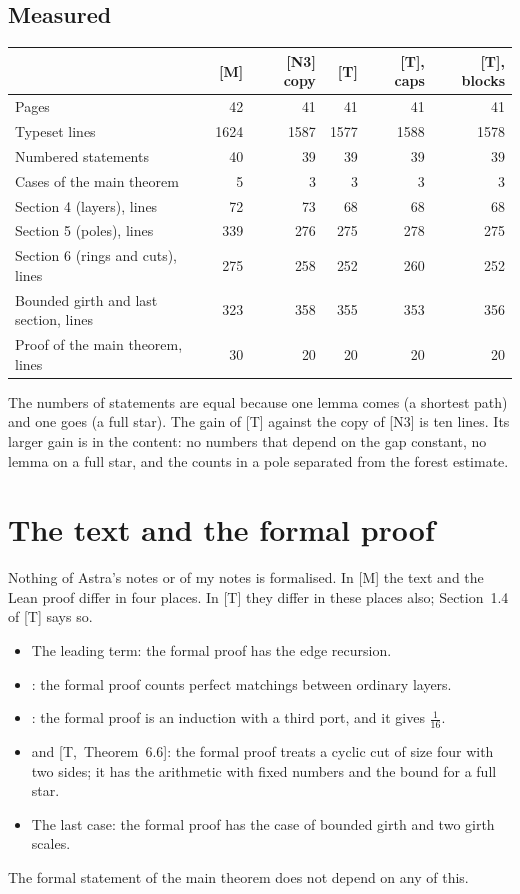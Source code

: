 \documentclass[11pt]{article}
\newcommand{\T}[1]{[T,~#1]}
\begin{document}
\subsection{Measured}

\begin{center}\small
\begin{tabular}{@{}p{5.2cm}rrrrr@{}}
\toprule
 & \textsf{\textbf{[M]}} & \textsf{\textbf{[N3] copy}} & \textsf{\textbf{[T]}} & \textsf{\textbf{[T], caps}} & \textsf{\textbf{[T], blocks}}\\
\midrule
Pages & 42 & 41 & 41 & 41 & 41\\
Typeset lines & 1624 & 1587 & 1577 & 1588 & 1578\\
Numbered statements & 40 & 39 & 39 & 39 & 39\\
Cases of the main theorem & 5 & 3 & 3 & 3 & 3\\
Section 4 (layers), lines & 72 & 73 & 68 & 68 & 68\\
Section 5 (poles), lines & 339 & 276 & 275 & 278 & 275\\
Section 6 (rings and cuts), lines & 275 & 258 & 252 & 260 & 252\\
Bounded girth and last section, lines & 323 & 358 & 355 & 353 & 356\\
Proof of the main theorem, lines & 30 & 20 & 20 & 20 & 20\\
\bottomrule
\end{tabular}
\end{center}

\noindent The numbers of statements are equal because one lemma comes (a shortest path) and one
goes (a full star). The gain of [T] against the copy of [N3] is ten lines. Its larger gain is in
the content: no numbers that depend on the gap constant, no lemma on a full star, and the
counts in a pole separated from the forest estimate.

\section{The text and the formal proof}\label{sec:formal}

Nothing of Astra's notes or of my notes is formalised. In [M] the text and the Lean proof differ
in four places. In [T] they differ in these places also; Section~1.4 of [T] says so.
\begin{itemize}[leftmargin=1.2em]
\item The leading term: the formal proof has the edge recursion.
\item \T{Theorem~5.5}: the formal proof counts perfect matchings between ordinary layers.
\item \T{Theorem~5.7}: the formal proof is an induction with a third port, and it gives
$\frac1{16}$.
\item \T{Lemma~6.5} and \T{Theorem~6.6}: the formal proof treats a cyclic cut of size four with
two sides; it has the arithmetic with fixed numbers and the bound for a full star.
\item The last case: the formal proof has the case of bounded girth and two girth scales.
\end{itemize}
The formal statement of the main theorem does not depend on any of this.
\end{document}
